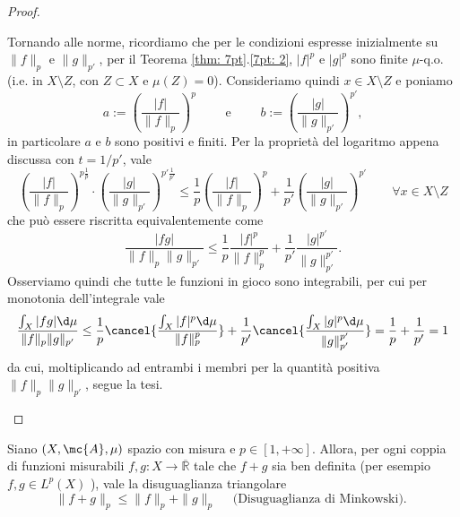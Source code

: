 \begin{proof}
\begin{itemize}
        Tornando alle norme, ricordiamo che per le condizioni espresse inizialmente su $\|f\|_p$ e $\|g\|_{p'}$, per il Teorema \ref{thm: 7pt}.\ref{7pt: 2}, $|f|^p$ e 
        $|g|^p$ sono finite $\mu$-q.o. (i.e. in $X\setminus Z$, con $Z\subset X$ e $\mu(Z)=0$). Consideriamo quindi $x\in X\setminus Z$ e poniamo 
        \[a:=\left( \frac{|f|}{\|f\|_p} \right)^p\qquad \text{ e }\qquad b:= \left( \frac{|g|}{\|g\|_{p'}} \right)^{p'}, \]
        in particolare $a$ e $b$ sono positivi e finiti. Per la proprietà del logaritmo appena discussa con $t = 1/p'$, vale
        \[\left( \frac{|f|}{\|f\|_p} \right)^{p\frac{1}{p}}\cdot \left( \frac{|g|}{\|g\|_{p'}} \right)^{p'\frac{1}{p'}}\leq \frac{1}{p}\left( \frac{|f|}{\|f\|_p}  \right)^p + \frac{1}{p'}\left( \frac{|g|}{\|g\|_{p'}} \right)^{p'} \qquad \forall x \in X\setminus Z\]
        che può essere riscritta equivalentemente come 
        \[\frac{|fg|}{\|f\|_p\|g\|_{p'}}\leq \frac{1}{p}\frac{|f|^p}{\|f\|_p^p}+\frac{1}{p'}\frac{|g|^{p'}}{\|g\|_{p'}^{p'}}.\]
        Osserviamo quindi che tutte le funzioni in gioco sono integrabili, per cui per monotonia dell'integrale vale
        \[\frac{\int_X|fg|\d \mu}{\|f\|_p\|g\|_{p'}}\leq \frac{1}{p}\cancel{\frac{\int_X|f|^p\d \mu}{\|f\|_p^p}} + \frac{1}{p'}\cancel{\frac{\int_X|g|^p\d \mu}{\|g\|_{p'}^{p'}}} = \frac{1}{p}+\frac{1}{p'} = 1\]
        da cui, moltiplicando ad entrambi i membri per la quantità positiva $\|f\|_p\|g\|_{p'}$, segue la tesi.
    \end{itemize}
\end{proof}

\begin{shadedTheorem}[$**$] \label{thm: 3.3 minkovski}
    Siano $(X, \mc{A}, \mu)$ spazio con misura e $p \in[1,+\infty]$. Allora, per ogni coppia di funzioni misurabili $f, g: X \rightarrow \overline{\mathbb{R}}$ tale che $f+g$ sia ben definita (per esempio $f, g \in L^{p}(X)$ ), vale la disuguaglianza triangolare
    \[
    \|f+g\|_{p} \leq\|f\|_{p}+\|g\|_{p} \quad \text { (Disuguaglianza di Minkowski). }
    \]
\end{shadedTheorem}

